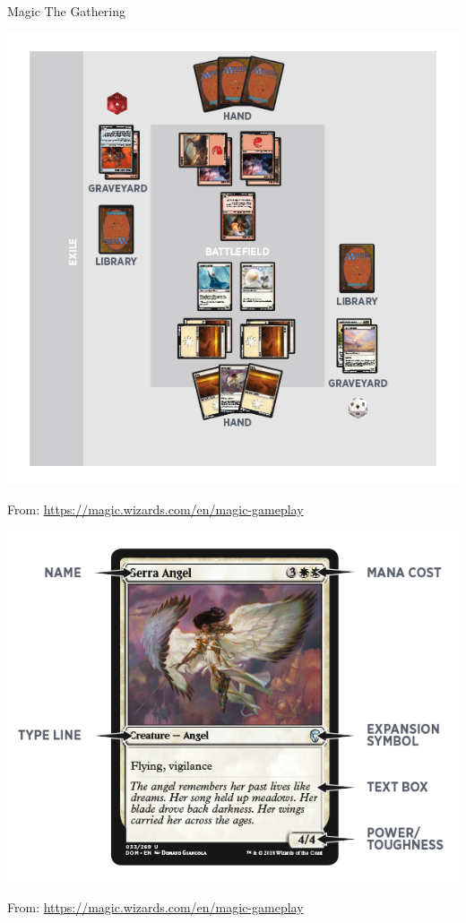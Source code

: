 \documentclass{beamer}
\begin{document}
    \begin{frame}
        \begin{center}
            \Huge
            Magic The Gathering
        \end{center}
    \end{frame}

    \begin{frame}
        \begin{center}
            \includegraphics[width=.8\textwidth]{./img/magic_battlefield/main.png}
        \end{center}
        \tiny{From: \url{https://magic.wizards.com/en/magic-gameplay}}
    \end{frame}

    \begin{frame}
        \begin{center}
            \includegraphics[height=.7\textwidth]{./img/serra_angel/main.png}
        \end{center}
        \tiny{From: \url{https://magic.wizards.com/en/magic-gameplay}}
    \end{frame}
\end{document}
